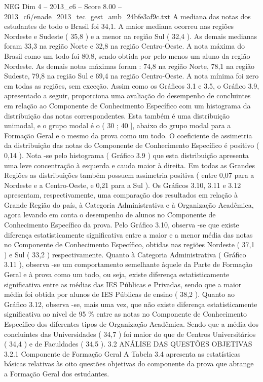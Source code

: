 \begin{textsample}{NEG Dim 4 – 2013\_c6 – Score 8.00 – 2013\_c6/enade\_2013\_tec\_gest\_amb\_24bfe3af9c.txt}
A mediana das notas dos estudantes de todo o Brasil foi 34,1.
A maior mediana ocorreu nas regiões Nordeste e Sudeste ( 35,8 ) e a menor na região Sul ( 32,4 ).
As demais medianas foram 33,3 na região Norte e 32,8 na região Centro-Oeste.
A nota máxima do Brasil como um todo foi 80,8, sendo obtida por pelo menos um aluno da região Nordeste.
As demais notas máximas foram : 74,8 na região Norte, 78,1 na região Sudeste, 79,8 na região Sul e 69,4 na região Centro-Oeste.
A nota mínima foi zero em todas as regiões, sem exceção.
Assim como os Gráficos 3.1 e 3.5, o Gráfico 3.9, apresentado a seguir, proporciona uma avaliação do desempenho de concluintes em relação ao Componente de Conhecimento Específico com um histograma da distribuição das notas correspondentes.
Esta também é uma distribuição unimodal, e o grupo modal é o ( 30 ; 40 ], abaixo do grupo modal para a Formação Geral e o mesmo da prova como um todo.
O coeficiente de assimetria da distribuição das notas do Componente de Conhecimento Específico é positivo ( 0,14 ).
Nota -se pelo histograma ( Gráfico 3.9 ) que esta distribuição apresenta uma leve concentração à esquerda e cauda maior à direita.
Em todas as Grandes Regiões as distribuições também possuem assimetria positiva ( entre 0,07 para a Nordeste e a Centro-Oeste, e 0,21 para a Sul ).
Os Gráficos 3.10, 3.11 e 3.12 apresentam, respectivamente, uma comparação dos resultados em relação à Grande Região do país, à Categoria Administrativa e à Organização Acadêmica, agora levando em conta o desempenho de alunos no Componente de Conhecimento Específico da prova.
Pelo Gráfico 3.10, observa -se que existe diferença estatisticamente significativa entre a maior e a menor média das notas no Componente de Conhecimento Específico, obtidas nas regiões Nordeste ( 37,1 ) e Sul ( 33,2 ) respectivamente.
Quanto à Categoria Administrativa ( Gráfico 3.11 ), observa -se um comportamento semelhante àquele da Parte de Formação Geral e à prova como um todo, ou seja, existe diferença estatisticamente significativa entre as médias das IES Públicas e Privadas, sendo que a maior média foi obtida por alunos de IES Públicas de ensino ( 38,2 ).
Quanto ao Gráfico 3.12, observa -se, mais uma vez, que não existe diferença estatisticamente significativa ao nível de 95 \% entre as notas no Componente de Conhecimento Específico dos diferentes tipos de Organização Acadêmica.
Sendo que a média dos concluintes das Universidades ( 34,7 ) foi maior do que de Centros Universitários ( 34,4 ) e de Faculdades ( 34,5 ). 3.2 ANÁLISE DAS QUESTÕES OBJETIVAS 3.2.1 Componente de Formação Geral A Tabela 3.4 apresenta as estatísticas básicas relativas às oito questões objetivas do componente da prova que abrange a Formação Geral dos estudantes.

\end{textsample}
